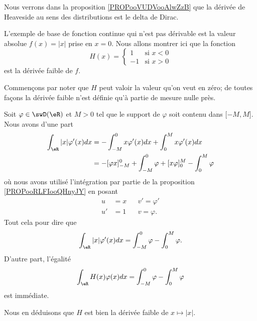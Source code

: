 \begin{normaltext}
    Nous verrons dans la proposition \ref{PROPooVUDVooAlwZzB} que la dérivée de Heaveside au sens des distributions est le delta de Dirac.
\end{normaltext}

\begin{example}
    L'exemple de base de fonction continue qui n'est pas dérivable est la valeur absolue \( f(x)=| x |\) prise en \( x=0\). Nous allons montrer ici que la fonction
    \begin{equation}
        H(x)=\begin{cases}
            1    &   \text{si } x<0\\
            -1    &    \text{si } x>0
        \end{cases}
    \end{equation}
    est la dérivée faible de \( f\).

    Commençons par noter que \( H\) peut valoir la valeur qu'on veut en zéro; de toutes façons la dérivée faible n'est définie qu'à partie de mesure nulle près.

    Soit \( \varphi\in \swD(\eR)\) et \( M>0\) tel que le support de \( \varphi\) soit contenu dans \( \mathopen[ -M , M \mathclose]\). Nous avons d'une part
    \begin{subequations}
        \begin{align}
            \int_{\eR}| x |\varphi'(x)dx&=-\int_{-M}^0x\varphi'(x)dx+\int_0^Mx\varphi'(x)dx\\
            &=-[\varphi x]_{-M}^0+\int_{-M}^0\varphi+[x\varphi]_0^M-\int_0^M\varphi
        \end{align}
    \end{subequations}
    où nous avons utilisé l'intégration par partie de la proposition \ref{PROPooRLFIooQHnyJY} en posant
    \begin{subequations}
        \begin{align}
            u&=x&&v'=\varphi'\\
            u'&=1&&v=\varphi.
        \end{align}
    \end{subequations}
    Tout cela pour dire que
    \begin{equation}
        \int_{\eR}| x |\varphi'(x)dx=\int_{-M}^0\varphi-\int_0^M\varphi.
    \end{equation}
    D'autre part, l'égalité
    \begin{equation}
        \int_{\eR}H(x)\varphi(x)dx= \int_{-M}^0\varphi-\int_0^M\varphi
    \end{equation}
    est immédiate.

    Nous en déduisons que \( H\) est bien la dérivée faible de \( x\mapsto | x |\).
\end{example}

